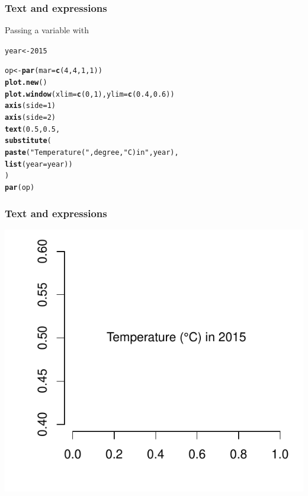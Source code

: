 \documentclass[12pt]{beamer}\usepackage[]{graphicx}\usepackage[]{color}
\makeatletter
\newcommand{\hlnum}[1]{\textcolor[rgb]{0.686,0.059,0.569}{#1}}%
\newcommand{\hlstr}[1]{\textcolor[rgb]{0.192,0.494,0.8}{#1}}%
\newcommand{\hlstd}[1]{\textcolor[rgb]{0.345,0.345,0.345}{#1}}%
\newcommand{\hlkwb}[1]{\textcolor[rgb]{0.69,0.353,0.396}{#1}}%
\newcommand{\hlkwc}[1]{\textcolor[rgb]{0.333,0.667,0.333}{#1}}%
\newcommand{\hlkwd}[1]{\textcolor[rgb]{0.737,0.353,0.396}{\textbf{#1}}}%
\newenvironment{kframe}{%
 \def\at@end@of@kframe{}%
 \ifinner\ifhmode%
  \def\at@end@of@kframe{\end{minipage}}%
  \begin{minipage}{\columnwidth}%
 \fi\fi%
 \def\FrameCommand##1{\hskip\@totalleftmargin \hskip-\fboxsep
 \colorbox{shadecolor}{##1}\hskip-\fboxsep
     \hskip-\linewidth \hskip-\@totalleftmargin \hskip\columnwidth}%
 \MakeFramed {\advance\hsize-\width
   \@totalleftmargin\z@ \linewidth\hsize
   \@setminipage}}%
 {\par\unskip\endMakeFramed%
 \at@end@of@kframe}
\newenvironment{knitrout}{}{} %
\makeatother
\begin{document}

\begin{frame}[fragile]
\frametitle{Text and expressions}

Passing a variable with {\hilit {}}
\begin{knitrout}\footnotesize
{}\color{fgcolor}\begin{kframe}
\begin{alltt}
\hlstd{year} \hlkwb{<-} \hlnum{2015}

\hlstd{op} \hlkwb{<-} \hlkwd{par}\hlstd{(}\hlkwc{mar} \hlstd{=} \hlkwd{c}\hlstd{(}\hlnum{4}\hlstd{,} \hlnum{4}\hlstd{,} \hlnum{1}\hlstd{,} \hlnum{1}\hlstd{))}
\hlkwd{plot.new}\hlstd{()}
\hlkwd{plot.window}\hlstd{(}\hlkwc{xlim} \hlstd{=} \hlkwd{c}\hlstd{(}\hlnum{0}\hlstd{,} \hlnum{1}\hlstd{),} \hlkwc{ylim} \hlstd{=} \hlkwd{c}\hlstd{(}\hlnum{0.4}\hlstd{,} \hlnum{0.6}\hlstd{))}
\hlkwd{axis}\hlstd{(}\hlkwc{side} \hlstd{=} \hlnum{1}\hlstd{)}
\hlkwd{axis}\hlstd{(}\hlkwc{side} \hlstd{=} \hlnum{2}\hlstd{)}
\hlkwd{text}\hlstd{(}\hlnum{0.5}\hlstd{,} \hlnum{0.5}\hlstd{,}
     \hlkwd{substitute}\hlstd{(}
       \hlkwd{paste}\hlstd{(}\hlstr{"Temperature ("}\hlstd{, degree,} \hlstr{"C) in "}\hlstd{, year),}
       \hlkwd{list}\hlstd{(}\hlkwc{year} \hlstd{= year))}
     \hlstd{)}
\hlkwd{par}\hlstd{(op)}
\end{alltt}
\end{kframe}
\end{knitrout}

\end{frame}


\begin{frame}[fragile]
\frametitle{Text and expressions}

\begin{knitrout}\footnotesize
{}\color{fgcolor}

{\centering \includegraphics[width=.8\linewidth,height=.7\linewidth]{figure/formula3-1} 

}



\end{knitrout}

\end{frame}
\end{document}
